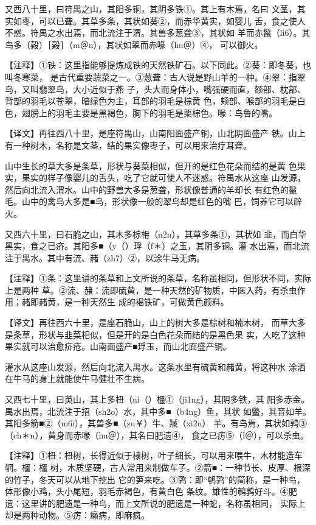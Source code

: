 \documentclass[a4paper,12pt,UTF8,twoside]{ctexbook}
\begin{document}
又西八十里，曰符禺之山，其阳多铜，其阴多铁①。其上有木焉，名曰 文茎，其实如枣，可以已聋。其草多条，其状如葵②，而赤华黄实，如婴儿 舌，食之使人不惑。符禺之水出焉，而北流注于渭。其兽多葱聋③，其状如 羊而赤鬣（li6）。其鸟多（穀）［榖］（m＠n），其状如翠而赤喙（hu＠）④， 可以御火。

【注释】①铁：这里指能够提炼成铁的天然铁矿石。以下同此。②葵：即冬葵，也叫冬寒菜， 是古代重要蔬菜之一。③葱聋：古人说是野山羊的一种。④翠：指翠鸟，又叫翡翠鸟，大小近似于燕 子，头大而身体小，嘴强硬而直，额部、枕部、背部的羽毛以苍翠，暗绿色为主，耳部的羽毛是棕黄 色，颊部、喉部的羽毛是白色，翅膀上的羽毛主要是黑褐色，胸下的羽毛是栗棕色。喙：鸟鲁的嘴。

【译文】再往西八十里，是座符禺山，山南阳面盛产铜，山北阴面盛产 铁。山上有一种树木，名称是文茎，结的果实像枣子，可以用来治疗耳聋。

山中生长的草大多是条草，形状与葵菜相似，但开的是红色花朵而结的是黄 色果实，果实的样子像婴儿的舌头，吃了它就可使人不迷惑。符禺水从这座 山发源，然后向北流入渭水。山中的野兽大多是葱聋，形状像普通的羊却长 有红色的鬣毛。山中的禽鸟大多是■鸟，形状像一般的翠鸟却是红色的嘴 巴，饲养它可以辟火。

又西六十里，曰石脆之山，其木多棕枏（n2n），其草多条①，其状如 韭，而白华黑实，食之已疥。其阳多■（y（）琈（f＊）之玉，其阴多铜。灌 水出焉，而北流注于禺水。其中有流、赭（zh7）②，以涂牛马无病。

【注释】①条：这里讲的条草和上文所说的条草，名称虽相同，但形状不同，实际上是两种 草。②流、赭：流即硫黄，是一种天然的矿物质，中医入药，有杀虫作用；赭即赭黄，是一种天然生 成的褐铁矿，可做黄色颜料。

【译文】再往西六十里，是座石脆山，山上的树大多是棕树和楠木树， 而草大多是条草，形状与韭菜相似，但是开的是白色花朵而结的是黑色果 实，人吃了这种果实就可以治愈疥疮。山南面盛产■琈玉，而山北面盛产铜。

灌水从这座山发源，然后向北流入禺水。这条水里有硫黄和赭黄，将这种水 涂洒在牛马的身上就能使牛马健壮不生病。

又西七十里，曰英山，其上多杻（ni（）橿①（ji1ng），其阴多铁，其 阳多赤金。禺水出焉，北流注于招（sh2o）水，其中多■（b4ng）鱼，其状 如鳖，其音如羊。其阳多箭■②（m6i），其兽多■（zu￥）牛、羬（xi2n） 羊。有鸟焉，其状如鹑③（ch＊n），黄身而赤喙（hu＠），其名曰肥遗④， 食之已疠⑤（l＠），可以杀虫。

【注释】①杻：杻树，长得近似于棣树，叶子细长，可以用来喂牛，木材能造车辋。橿：橿 树，木质坚硬，古人常用来制做车子。②箭■：一种节长、皮厚、根深的竹子，冬天可以从地下挖出 它的笋来吃。③鹑：即“鹌鹑”的简称，是一种鸟，体形像小鸡，头小尾短，羽毛赤褐色，有黄白色 条纹。雄性的鹌鹑好斗。④肥遗：这里讲的肥遗是一种鸟，而上文所说的肥遗是一种蛇，名称虽相同， 实际上却是两种动物。⑤疠：癞病，即麻疯。
\end{document}
